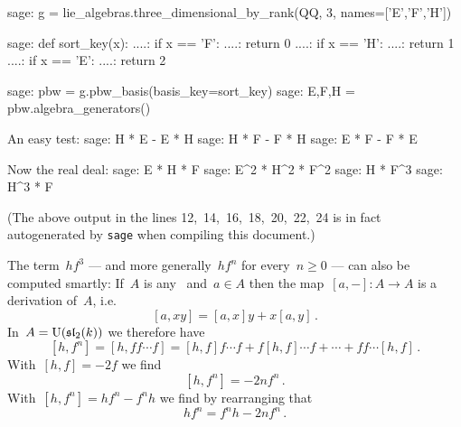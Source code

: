 \begin{sagecommandline}
sage: g = lie_algebras.three_dimensional_by_rank(QQ, 3, names=['E','F','H'])

sage: def sort_key(x):                                       
....:   if x == 'F':
....:     return 0
....:   if x == 'H':
....:     return 1
....:   if x == 'E':
....:     return 2


sage: pbw = g.pbw_basis(basis_key=sort_key)
sage: E,F,H = pbw.algebra_generators()

An easy test:
sage: H * E - E * H
sage: H * F - F * H
sage: E * F - F * E

Now the real deal:
sage: E * H * F
sage: E^2 * H^2 * F^2
sage: H * F^3
sage: H^3 * F
\end{sagecommandline}
(The above output in the lines 12,~14,~16,~18,~20,~22,~24 is in fact autogenerated by \texttt{sage} when compiling this document.)

\begin{remark}
  The term~$h f^3$ --- and more generally~$h f^n$ for every~$n \geq 0$ --- can also be computed smartly:
  If~$A$ is any~{} and~$a \in A$ then the map~$[a,-] \colon A \to A$ is a derivation of~$A$, i.e.
  \[
    [a, xy]
    =
    [a,x] y + x [a,y] \,.
  \]
  In~$A = \operatorname{U}(\mathfrak{sl}_2(k))$ we therefore have
  \[
    [h, f^n]
    =
    [h, f f \dotsm f]
    =
      [h,f] f \dotsm f
    + f [h, f] \dotsm f
    + \dotsb
    + f f \dotsm [h,f] \,.
  \]
  With~$[h,f] = -2f$ we find
  \[
    [h, f^n]
    =
    -2 n f^n \,.
  \]
  With~$[h, f^n] = h f^n - f^n h$ we find by rearranging that
  \[
    h f^n = f^n h - 2 n f^n \,.
  \]
\end{remark}

